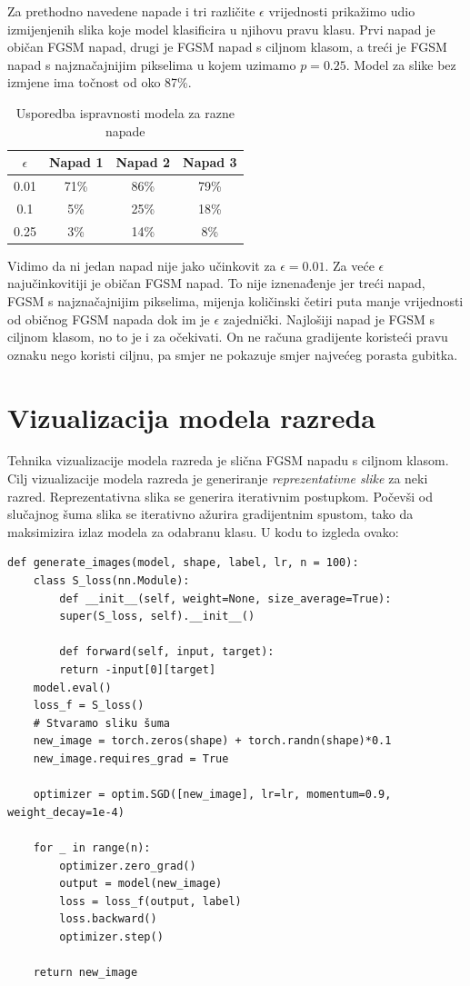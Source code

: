 Za prethodno navedene napade i tri različite $\epsilon$ vrijednosti prikažimo udio izmijenjenih slika koje model klasificira u njihovu pravu klasu. Prvi napad je običan FGSM napad, drugi je FGSM napad s ciljnom klasom, a treći je FGSM napad s najznačajnijim pikselima u kojem uzimamo $p = 0.25$. Model za slike bez izmjene ima točnost od oko 87\%.

\begin{table}[H]
	\centering
	\begin{tabular}{||c || c | c | c||} 
		\hline
		$\epsilon$ & Napad 1 & Napad 2 & Napad 3 \\ [0.5ex] 
		\hline\hline
		0.01 & 71\% & 86\% & 79\% \\ 
		0.1 & 5\% & 25\% & 18\% \\
		0.25 & 3\% & 14\% & 8\% \\ [1ex] 
		\hline
	\end{tabular}
	\caption{Usporedba ispravnosti modela za razne napade}
\end{table}

Vidimo da ni jedan napad nije jako učinkovit za $\epsilon = 0.01$. Za veće $\epsilon$ najučinkovitiji je običan FGSM napad. To nije iznenađenje jer treći napad, FGSM s najznačajnijim pikselima, mijenja količinski četiri puta manje vrijednosti od običnog FGSM napada dok im je $\epsilon$ zajednički. Najlošiji napad je FGSM s ciljnom klasom, no to je i za očekivati. On ne računa gradijente koristeći pravu oznaku nego koristi ciljnu, pa smjer ne pokazuje smjer najvećeg porasta gubitka.

\section{Vizualizacija modela razreda}

Tehnika vizualizacije modela razreda je slična FGSM napadu s ciljnom klasom. Cilj vizualizacije modela razreda je generiranje \textit{reprezentativne slike} za neki razred. Reprezentativna slika se generira iterativnim postupkom. Počevši od slučajnog šuma slika se iterativno ažurira gradijentnim spustom, tako da maksimizira izlaz modela za odabranu klasu. U kodu to izgleda ovako:

\begin{verbatim}
def generate_images(model, shape, label, lr, n = 100):
	class S_loss(nn.Module):
		def __init__(self, weight=None, size_average=True):
		super(S_loss, self).__init__()
		
		def forward(self, input, target):
		return -input[0][target]
	model.eval()
	loss_f = S_loss()
	# Stvaramo sliku šuma
	new_image = torch.zeros(shape) + torch.randn(shape)*0.1
	new_image.requires_grad = True
	
	optimizer = optim.SGD([new_image], lr=lr, momentum=0.9, weight_decay=1e-4)
	
	for _ in range(n):
		optimizer.zero_grad()
		output = model(new_image)
		loss = loss_f(output, label)
		loss.backward()
		optimizer.step()

	return new_image
\end{verbatim}

